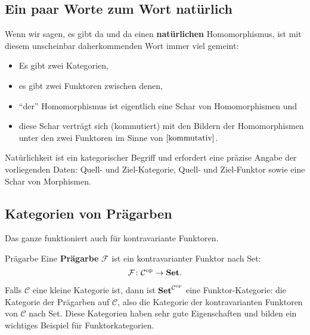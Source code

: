 \documentclass[a4paper]{amsart}
\theoremstyle{definition}
\begin{document}
\subsection{Ein paar Worte zum Wort natürlich}
Wenn wir sagen, es gibt da und da einen \textbf{natürlichen} Homomorphismus, ist mit diesem unscheinbar daherkommenden Wort immer viel gemeint:
\begin{itemize}
	\item Es gibt zwei Kategorien,
	\item es gibt zwei Funktoren zwischen denen,
	\item "`der"' Homomorphismus ist eigentlich eine Schar von Homomorphismen und
	\item diese Schar verträgt sich (kommutiert) mit den Bildern der Homomorphismen unter den zwei Funktoren im Sinne von $\eqref{kommutativ}$.
\end{itemize} 
Natürlichkeit ist ein kategorischer Begriff und erfordert eine präzise Angabe der vorliegenden Daten: Quell- und Ziel-Kategorie, Quell- und Ziel-Funktor sowie eine Schar von Morphismen.

\subsection{Kategorien von Prägarben}
Das ganze funktioniert auch für kontravariante Funktoren.

\begin{Definition}{Prägarbe}
   Eine \textbf{Prägarbe} $\mathcal F$ ist ein kontravarianter Funktor nach Set:
   \begin{equation}
      \mathcal F \colon \mathcal C ^{\text{op}} \to \text{\textbf{Set}}.
   \end{equation}
\end{Definition}

Falls $\mathcal C$ eine kleine Kategorie ist, dann ist $\text{\textbf{Set}} ^ {\mathcal C ^{\text{op}}}$ eine Funktor-Kategorie: die Kategorie der Prägarben auf $\mathcal C$, also die Kategorie der kontravarianten Funktoren von $\mathcal C$ nach Set. Diese Kategorien haben sehr gute Eigenschaften und bilden ein wichtiges Beispiel für Funktorkategorien.

\end{document}

